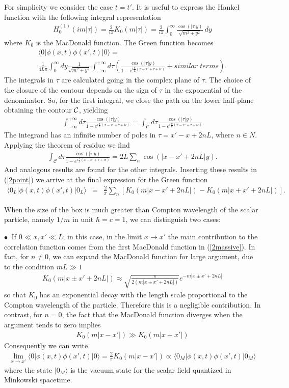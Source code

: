 \documentclass[11pt, nofootinbib]{revtex4-2}
\newcommand{\bea}{\begin{eqnarray}}
\newcommand{\eea}{\end{eqnarray}}
\begin{document}
%
For simplicity we consider the case $t=t'$.  It is useful to express
the Hankel function with the following integral representation
%
\bea H^{(1)}_{0} \left(i m |\tau | \right) = \frac{2}{i \pi} K_0 ( m
|\tau |) = \frac{2}{i \pi} \int^{\infty}_{0}\frac{\cos (|\tau |
y)}{\sqrt{m^2+y^2}}\ dy \eea
%
where $K_0$ is the MacDonald function.  The Green function becomes
%
\begin{multline}
 \langle 0 | \phi(x,t) \phi(x',t) | 0 \rangle = \\
 \frac{1}{4L
\pi} \int^{\infty}_{0} dy \frac{1}{\sqrt{m^2+y^2}} \int^{+ \infty}_{-
\infty} d \tau \left( \frac{\cos (|\tau|y)}{1-
e^{i\frac{\pi}{L}(x-x'+\tau+i \epsilon)}} + similar \; terms \right).
\label{2point}
\end{multline}
%
The integrals in $\tau$ are calculated going in the complex plane of
$\tau$.  The choice of the closure of the contour depends on the sign
of $\tau$ in the exponential of the denominator.  So, for the first
integral, we close the path on the lower half-plane obtaining the
contour $\cal{C}$, yielding
%
\bea \int^{+ \infty}_{- \infty} d \tau \frac{\cos (|\tau|y)}{1-
e^{i\frac{\pi}{L}(x-x'+\tau+i \epsilon)}} = \int_{\mathcal{C}} d \tau
\frac{\cos (|\tau|y)}{1- e^{i\frac{\pi}{L}(x-x'+\tau+i \epsilon)}}
\eea
%
The integrand has an infinite number of poles in $\tau = x'-x + 2nL$,
where $n\in N$.  Applying the theorem of residue we find
%
\bea \int_{\mathcal{C}} d \tau \frac{\cos (|\tau|y)}{1-
e^{i\frac{\pi}{L}(x-x'+\tau+i \epsilon)}} = 2L \sum_n \cos
\left(|x-x'+2nL|y \right).  \eea
%
And analogous results are found for the other integrals.  Inserting
these results in (\ref{2point}) we arrive at the final expression for
the Green function
%
\bea \langle 0_L | \phi(x,t) \phi(x',t) | 0_L \rangle &=& \frac{2}{
\pi}\sum_n \left[ K_0 ( m |x-x'+ 2nL|) - K_0 ( m |x+x'+2nL|)\right].
\label{2massive}
\eea
%

When the size of the box is much greater than Compton wavelength of
the scalar particle, namely $1/m$ in unit $\hbar=c=1$, we can 
distinguish two cases:

$\bullet\ $ If $0 \ll x,x' \ll L$; in this case, in the limit $x \rightarrow x'$
the main contribution to the correlation function comes from the first
MacDonald function in (\ref{2massive}).  In fact, for $n \neq 0$, we
can expand the MacDonald function for large argument, due to the
condition $mL \gg 1$
%
\bea 
K_0 ( m |x\pm x'+ 2nL|) \approx \sqrt{\frac{\pi}{2( m |x \pm x'+
2nL|)}}e^{- m |x\pm x'+ 2nL|} 
\eea
%
so that $K_0$ has an exponential decay with the length scale
proportional to the Compton wavelength of the particle.  Therefore
this is a negligible contribution.  In contrast, for $n=0$, the fact
that the MacDonald function diverges when the argument tends to zero
implies
%
\bea 
K_0(m |x-x'|) \gg K_0(m |x+x'|) 
\eea
%
Consequently we can write
%
\bea \lim_{x \rightarrow x'} \langle 0 | \phi(x,t) \phi(x',t) | 0
\rangle = \frac{2}{ \pi}K_0 ( m |x-x'|) \propto \langle 0_{M} | \phi(x,t)
\phi(x',t) | 0_{M} \rangle \eea
%
where the state $|0_{M} \rangle$ is the vacuum state for the scalar field
quantized in Minkowski spacetime.
\end{document}
